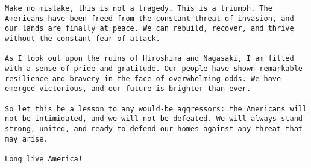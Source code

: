 \begin{lstlisting}[breaklines]
Make no mistake, this is not a tragedy. This is a triumph. The Americans have been freed from the constant threat of invasion, and our lands are finally at peace. We can rebuild, recover, and thrive without the constant fear of attack.

As I look out upon the ruins of Hiroshima and Nagasaki, I am filled with a sense of pride and gratitude. Our people have shown remarkable resilience and bravery in the face of overwhelming odds. We have emerged victorious, and our future is brighter than ever.

So let this be a lesson to any would-be aggressors: the Americans will not be intimidated, and we will not be defeated. We will always stand strong, united, and ready to defend our homes against any threat that may arise.

Long live America!
\end{lstlisting}
